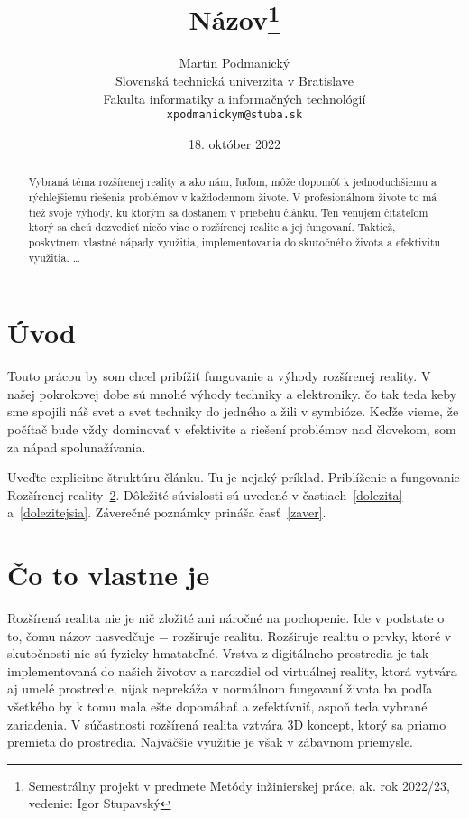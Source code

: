 \documentclass[10pt,twoside,slovak,a4paper]{article}
\title{Názov\thanks{Semestrálny projekt v predmete Metódy inžinierskej práce, ak. rok 2022/23, vedenie: Igor Stupavský}} %
\author{Martin Podmanický\\[2pt]
	{\small Slovenská technická univerzita v Bratislave}\\
	{\small Fakulta informatiky a informačných technológií}\\
	{\small \texttt{xpodmanickym@stuba.sk}}
	}
\date{\small 18. október 2022} %
\begin{document}
\maketitle

\begin{abstract}
Vybraná téma rozšírenej reality a ako nám, ľuďom, môže dopomôť k jednoduchšiemu a rýchlejšiemu riešenia problémov v každodennom živote.
V profesionálnom živote to má tieź svoje výhody, ku ktorým sa dostanem v priebehu článku. 
Ten venujem čitateľom ktorý sa chcú dozvedieť niečo viac o rozšírenej realite a jej fungovaní.
Taktiež, poskytnem vlastné nápady využitia, implementovania do skutočného života a efektivitu využitia.
\ldots
\end{abstract}



\section{Úvod}

Touto prácou by som chcel pribížiť fungovanie a výhody rozšírenej reality. V našej pokrokovej dobe sú mnohé výhody techniky a elektroniky.
čo tak teda keby sme spojili náš svet a svet techniky do jedného a žili v symbióze. Keďže vieme, že počítač bude vždy dominovať v efektivite a riešení problémov nad človekom,
som za nápad spolunažívania.

Uveďte explicitne štruktúru článku. Tu je nejaký príklad.
Priblíženie a fungovanie Rozšírenej reality~\ref{2}.
Dôležité súvislosti sú uvedené v častiach~\ref{dolezita} a~\ref{dolezitejsia}.
Záverečné poznámky prináša časť~\ref{zaver}.



\section{Čo to vlastne je} \label{2}

Rozšírená realita nie je nič zložité ani náročné na pochopenie. Ide v podstate o to, čomu názov nasvedčuje = rozširuje realitu. Rozširuje realitu o prvky, ktoré v skutočnosti nie sú fyzicky hmatateľné. Vrstva z digitálneho prostredia je tak implementovaná do našich životov a narozdiel od virtuálnej reality, ktorá vytvára aj umelé prostredie, nijak neprekáža v normálnom fungovaní života ba podľa všetkého by k tomu mala ešte dopomáhať a zefektívniť, aspoň teda vybrané zariadenia. V súčastnosti rozšírená realita vztvára  3D koncept, ktorý sa priamo premieta do prostredia. Najväčšie využitie je však v zábavnom priemysle.
\end{document}
